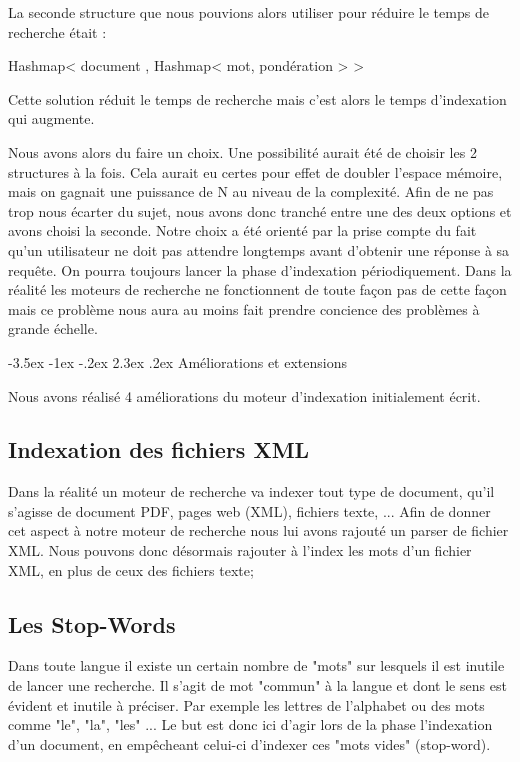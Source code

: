 \documentclass[a4paper,12pt]{article}
\makeatletter
\renewcommand\section{\@startsection {section}{1}{\z@}%
                           {-3.5ex \@plus -1ex \@minus -.2ex}%
                           {2.3ex \@plus.2ex}%
                           {\normalfont\Large\bfseries}}
\makeatother
\begin{document}
La seconde structure que nous pouvions alors utiliser pour réduire le temps de recherche était : 

Hashmap< document , Hashmap< mot, pondération >  >

Cette solution réduit le temps de recherche mais c'est alors le temps d'indexation qui augmente.

Nous avons alors du faire un choix. Une possibilité aurait été de choisir les 2 structures à la fois. Cela aurait eu certes pour effet de doubler l'espace mémoire, mais on gagnait une puissance de N au niveau de la complexité.
Afin de ne pas trop nous écarter du sujet, nous avons donc tranché entre une des deux options et avons choisi la seconde. Notre choix a été orienté par la prise compte du fait qu'un utilisateur
ne doit pas attendre longtemps avant d'obtenir une réponse à sa requête. On pourra toujours lancer la phase d'indexation périodiquement. Dans la réalité les moteurs de recherche ne fonctionnent de toute façon pas de cette façon mais ce problème nous aura au moins fait prendre concience des problèmes à grande échelle.

\section{Améliorations et extensions}

Nous avons réalisé 4 améliorations du moteur d'indexation initialement écrit.

\subsection{Indexation des fichiers XML}

Dans la réalité un moteur de recherche va indexer tout type de document, qu'il s'agisse de document PDF, pages web (XML), fichiers texte, ...
Afin de donner cet aspect à notre moteur de recherche nous lui avons rajouté un parser de fichier XML. Nous pouvons donc désormais rajouter à l'index les mots d'un fichier XML, en plus de ceux des fichiers texte;

\subsection{Les Stop-Words}

Dans toute langue il existe un certain nombre de "mots" sur lesquels il est inutile de lancer une recherche. Il s'agit de mot "commun" à la langue et dont le sens est évident et inutile à préciser. Par exemple les lettres de l'alphabet ou des mots comme "le", "la", "les" ... Le but est donc ici d'agir lors de la phase l'indexation d'un document, en empêcheant celui-ci d'indexer ces "mots vides" (stop-word).
\end{document}
